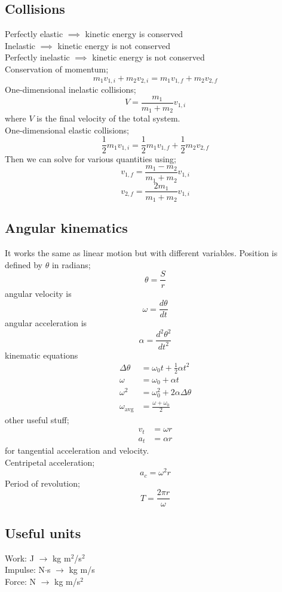 \documentclass{article}
\begin{document}
\begin{multicols}{2}
\subsection*{Collisions}
Perfectly elastic $\implies$ kinetic energy is conserved \\
Inelastic $\implies$ kinetic energy is not conserved \\
Perfectly inelastic $\implies$ kinetic energy is not conserved\\
Conservation of momentum;
\[
	m_1v_{1,i} + m_2v_{2,i} = m_1v_{1,f} + m_2v_{2,f}
\]
One-dimensional inelastic collisions;
\[
	V= \frac{m_1}{m_1 + m_2}v_{1,i}
\]
where $V$ is the final velocity of the total system.\\
One-dimensional elastic collisions;
\[
	\frac{1}{2}m_1v_{1,i} = \frac{1}{2}m_1v_{1,f} + \frac{1}{2}m_2v_{2,f}
\]
Then we can solve for various quantities using;
\[
	v_{1,f} = \frac{m_1 - m_2}{m_1 + m_2}v_{1,i}
\]
\[
	v_{2,f} = \frac{2m_1}{m_1 + m_2}v_{1,i}
\]

\subsection*{Angular kinematics}
It works the same as linear motion but with different variables. Position is defined by $\theta$ in radians;
\[
	\theta = \frac{S}{r}
\]
angular velocity is
\[
	\omega = \frac{d\theta}{dt}
\]
angular acceleration is
\[
	\alpha = \frac{d^2\theta^2}{dt^2}
\]
kinematic equations
\begin{align*}
	\Delta \theta &= \omega_0 t + \frac{1}{2}\alpha t^2 \\
	\omega &= \omega_0 + \alpha t \\
	\omega^2 &= \omega_0^2 + 2 \alpha \Delta \theta \\
	\omega_\text{avg} &= \frac{\omega + \omega_0}{2}
\end{align*}
other useful stuff;
\begin{align*}
	v_t &= \omega r \\
	a_t &= \alpha r
\end{align*}
for tangential acceleration and velocity. \\
Centripetal acceleration;
\[
	a_c = \omega^2 r
\]
Period of revolution;
\[
	T = \frac{2 \pi r}{\omega}
\]

\subsection*{Useful units}
Work: J $\rightarrow$ kg m$^2$/s$^2$ \\
Impulse: N$\cdot$s $\rightarrow$ kg m/s \\
Force: N $\rightarrow$ kg m/s$^2$



\end{multicols}
\end{document}
